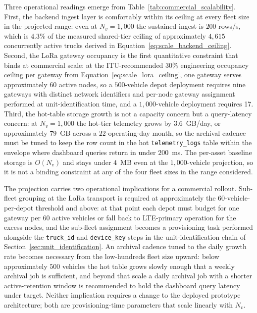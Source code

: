 Three operational readings emerge from Table~\ref{tab:commercial_scalability}. First, the backend ingest layer is comfortably within its ceiling at every fleet size in the projected range: even at $N_v = 1{,}000$ the sustained ingest is $200$ rows/s, which is $4.3\%$ of the measured shared-tier ceiling of approximately $4{,}615$ concurrently active trucks derived in Equation~\ref{eq:scale_backend_ceiling}. Second, the LoRa gateway occupancy is the first quantitative constraint that binds at commercial scale: at the ITU-recommended $30\%$ engineering occupancy ceiling per gateway from Equation~\ref{eq:scale_lora_ceiling}, one gateway serves approximately $60$ active nodes, so a $500$-vehicle depot deployment requires nine gateways with distinct network identifiers and per-node gateway assignment performed at unit-identification time, and a $1{,}000$-vehicle deployment requires 17. Third, the hot-table storage growth is not a capacity concern but a query-latency concern: at $N_v = 1{,}000$ the hot-tier telemetry grows by $3.6$~GB/day, or approximately $79$~GB across a $22$-operating-day month, so the archival cadence must be tuned to keep the row count in the hot \texttt{telemetry\_logs} table within the envelope where dashboard queries return in under $200$~ms. The per-asset baseline storage is $O(N_v)$ and stays under $4$~MB even at the $1{,}000$-vehicle projection, so it is not a binding constraint at any of the four fleet sizes in the range considered.

The projection carries two operational implications for a commercial rollout. Sub-fleet grouping at the LoRa transport is required at approximately the $60$-vehicle-per-depot threshold and above: at that point each depot must budget for one gateway per 60 active vehicles or fall back to LTE-primary operation for the excess nodes, and the sub-fleet assignment becomes a provisioning task performed alongside the \texttt{truck\_id} and \texttt{device\_key} steps in the unit-identification chain of Section~\ref{sec:unit_identification}. An archival cadence tuned to the daily growth rate becomes necessary from the low-hundreds fleet size upward: below approximately $500$ vehicles the hot table grows slowly enough that a weekly archival job is sufficient, and beyond that scale a daily archival job with a shorter active-retention window is recommended to hold the dashboard query latency under target. Neither implication requires a change to the deployed prototype architecture; both are provisioning-time parameters that scale linearly with $N_v$.

